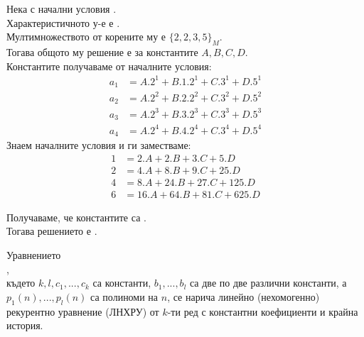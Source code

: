 \begin{example}
    Нека  с начални условия 
    . \\
    Характеристичното у-е е . \\
    Мултимножеството от корените му е \(\{2, 2, 3, 5\}_M\). \\
    Тогава общото му решение е  за константите \(A, B, C, D\). \\
    Константите получаваме от началните условия:
    \begin{align*}
        a_1 &= A.2^1 + B.1.2^1 + C.3^1 + D.5^1 \\
        a_2 &= A.2^2 + B.2.2^2 + C.3^2 + D.5^2 \\
        a_3 &= A.2^3 + B.3.2^3 + C.3^3 + D.5^3 \\
        a_4 &= A.2^4 + B.4.2^4 + C.3^4 + D.5^4
    \end{align*}
    Знаем началните условия и ги заместваме:
    \begin{align*}
        1 &= 2.A + 2.B + 3.C + 5.D \\
        2 &= 4.A + 8.B + 9.C + 25.D \\
        4 &= 8.A + 24.B + 27.C + 125.D \\
        6 &= 16.A + 64.B + 81.C + 625.D
    \end{align*}
\end{example}

Получаваме, че константите са . \\
Тогава решението е .

\begin{definition}
    Уравнението \\
    , \\
    където \(k, l, c_1, ..., c_k\) са константи, \(b_1, ..., b_l\) са две по две различни константи, а
    \(p_1(n), ..., p_l(n)\) са полиноми на \(n\), се нарича линейно (нехомогенно) рекурентно 
    уравнение (ЛНХРУ) от \(k\)-ти ред с константни коефициенти и крайна история.
\end{definition}

